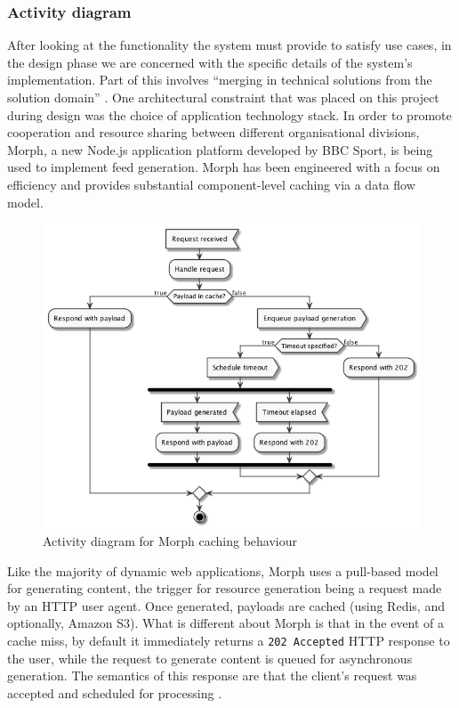 \documentclass[runningheads,a4paper]{llncs}
\begin{document}
\subsubsection{Activity diagram}

After looking at the functionality the system must provide to satisfy use cases, in the design phase we are concerned with the specific details of the system's implementation. Part of this involves ``merging in technical solutions from the solution domain'' \cite{arlow}. One architectural constraint that was placed on this project during design was the choice of application technology stack. In order to promote cooperation and resource sharing between different organisational divisions, Morph, a new Node.js application platform developed by BBC Sport, is being used to implement feed generation. Morph has been engineered with a focus on efficiency and provides substantial component-level caching via a data flow model.

\begin{figure}
\centering
\includegraphics[width=\textwidth]{activity}
\caption{Activity diagram for Morph caching behaviour}
\label{fig:activity-diag}
\end{figure}

Like the majority of dynamic web applications, Morph uses a pull-based model for generating content, the trigger for resource generation being a request made by an HTTP user agent. Once generated, payloads are cached (using Redis, and optionally, Amazon S3). What is different about Morph is that in the event of a cache miss, by default it immediately returns a \texttt{202 Accepted} HTTP response \cite{ietf} to the user, while the request to generate content is queued for asynchronous generation. The semantics of this response are that the client's request was accepted and scheduled for processing \cite{webcaching}.
\end{document}
